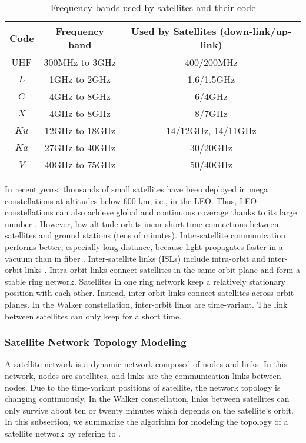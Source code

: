 \documentclass[lettersize,journal]{IEEEtran}
\begin{document}
\begin{table}[htbp!]
  \centering
  \caption{Frequency bands used by satellites and their code}
  \label{tab4}
  \begin{tabular}{ccc} \hline
  \textbf{Code} & \textbf{Frequency band} & \textbf{Used by Satellites (down-link/up-link)} \\ \hline
  UHF & 300MHz to 3GHz & 400/200MHz \\
  $L$ & 1GHz to 2GHz & 1.6/1.5GHz \\
  $C$ & 4GHz to 8GHz & 6/4GHz \\
  $X$ & 4GHz to 8GHz & 8/7GHz \\
  $Ku$ & 12GHz to 18GHz & 14/12GHz, 14/11GHz \\
  $Ka$ & 27GHz to 40GHz & 30/20GHz \\ 
  $V$ & 40GHz to 75GHz & 50/40GHz \\ \hline
  \end{tabular}
\end{table}

In recent years, thousands of small satellites have been deployed in mega constellations at altitudes below 600 km, i.e., in the LEO. Thus, 
LEO constellations can also achieve global and continuous coverage thanks to its large number \cite{RN170,RN171}. However, low altitude orbits incur short-time connections between satellites and ground stations (tens of minutes). Inter-satellite communication performs better, especially long-distance, because light propagates faster in a vacuum than in fiber \cite{RN172}. Inter-satellite links (ISLs) include intra-orbit and inter-orbit links \cite{RN218}. Intra-orbit links connect satellites in the same orbit plane and form a stable ring network. Satellites in one ring network keep a relatively stationary position with each other. Instead, inter-orbit links connect satellites across orbit planes. In the Walker constellation, inter-orbit links are time-variant. The link between satellites can only keep for a short time.  

\subsubsection*{Satellite Network Topology Modeling}
A satellite network is a dynamic network composed of nodes and links. In this network, nodes are satellites, and links are the communication links between nodes. Due to the time-variant positions of satellite, the network topology is changing continuously. In the Walker constellation, links between satellites can only survive about ten or twenty minutes which depends on the satellite's orbit. In this subsection, we summarize the algorithm for modeling the topology of a satellite network by refering to \cite{RN196}.
\end{document}
